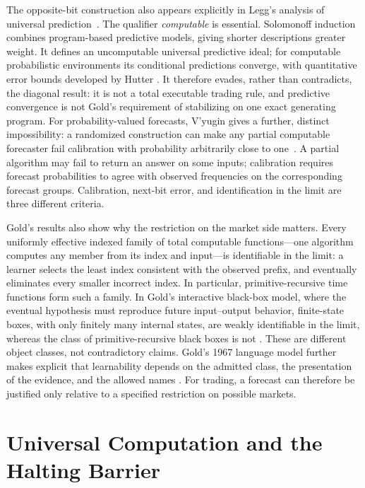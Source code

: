 \documentclass[aps,pra,reprint,superscriptaddress,amsmath,amssymb,floatfix]{revtex4-2}
\theoremstyle{plain}
\theoremstyle{definition}
\theoremstyle{remark}
\begin{document}
The opposite-bit construction also appears explicitly in Legg's analysis of
universal prediction~\cite{Legg2006}. The qualifier \emph{computable} is
essential. Solomonoff induction combines program-based predictive models,
giving shorter descriptions greater weight. It defines an uncomputable
universal predictive ideal; for computable probabilistic environments its conditional predictions
converge, with quantitative error bounds developed by Hutter
\cite{solomonoff,solomonoff-II,solomonoff1,Hutter2001}. It therefore evades,
rather than contradicts, the diagonal result: it is not a total executable
trading rule, and predictive convergence is not Gold's requirement of
stabilizing on one exact generating program. For probability-valued forecasts,
V'yugin gives a further, distinct impossibility: a randomized construction can
make any partial computable forecaster fail calibration with probability
arbitrarily close to one~\cite{Vyugin2006}. A partial algorithm may fail to
return an answer on some inputs; calibration requires forecast probabilities
to agree with observed frequencies on the corresponding forecast groups.
Calibration, next-bit error, and identification in the limit are three
different criteria.

Gold's results also show why the restriction on the market side matters. Every
uniformly effective indexed family of total computable functions---one
algorithm computes any member from its index and input---is identifiable in the limit: a learner selects the least index consistent with
the observed prefix, and eventually eliminates every smaller incorrect index.
In particular, primitive-recursive time functions form such a family. In Gold's interactive
black-box model, where the eventual hypothesis must reproduce future
input--output behavior, finite-state boxes, with only finitely many internal
states, are weakly identifiable in the limit, whereas the class of
primitive-recursive black boxes is not
\cite{go-65}. These are different object classes, not contradictory claims.
Gold's 1967 language model further makes explicit that learnability depends on
the admitted class, the presentation of the evidence, and the allowed names
\cite{go-67}. For trading, a forecast can therefore be justified only relative
to a specified restriction on possible markets.

\section{Universal Computation and the Halting Barrier}
\label{sec:halting}
\end{document}
